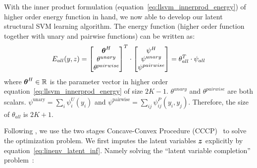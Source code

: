 \documentclass[sigconf,anonymous,review]{acmart}
\renewcommand{\citename}{\citet}
\renewcommand{\cite}{\citep}
\begin{document}
With the inner product formulation
(equation~\eqref{eq:llsvm_innerprod_energy}) of higher order
energy function in hand, we now able to develop our latent
structural SVM learning algorithm. The energy function (higher
order function together with unary and pairwise functions) can be
written as:
\begin{equation}
  E_{all}(y,z) = \begin{bmatrix}
    \boldsymbol{\theta}^H\\
    \theta^{unary}\\
    \theta^{pairwise}
  \end{bmatrix}^T 
  \cdot \begin{bmatrix}
    \psi^H\\
    \psi^{unary}\\
    \psi^{pairwise}
  \end{bmatrix}=\theta_{all}^T\cdot\psi_{all}
\end{equation}
where $\boldsymbol{\theta}^H\in \mathbb{R}$ is the parameter vector in higher
order equation~\eqref{eq:llsvm_innerprod_energy} of size $2K-1$.
$\theta^{unary}$ and $\theta^{pairwise}$ are both scalars.
$\psi^\textrm{unary} = \sum_i \psi^U_i\!(y_i)$ and
$\psi^\textrm{pairwise} = \sum_{ij} \psi^P_{ij}(y_i, y_j)$.
Therefore, the size of $\theta_{all}$ is $2K+1$.



Following \citename{yu2009learning}, we use the two stages Concave-Convex
Procedure (CCCP)~\cite{yuille2002concave} to solve the
optimization problem. We first
imputes the latent variables ${\boldsymbol{z}}$ explicitly by
equation~\eqref{eq:linenv_latent_inf}. Namely solving the
``latent variable completion'' problem~\cite{yu2009learning}:
\end{document}
